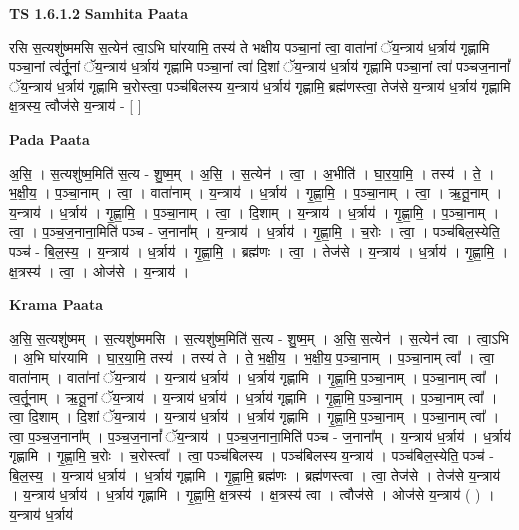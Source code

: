 \documentclass[17pt]{extarticle}
\begin{document}
\textbf{TS 1.6.1.2 } \newline
\textbf{Samhita Paata} \newline

रसि स॒त्यशु॑ष्ममसि स॒त्येन॑ त्वा॒ऽभि घा॑रयामि॒ तस्य॑ ते भक्षीय पञ्चा॒नां त्वा॒ वाता॑नां ॅय॒न्त्राय॑ ध॒र्त्राय॑ गृह्णामि पञ्चा॒नां त्व॑र्तू॒नां ॅय॒न्त्राय॑ ध॒र्त्राय॑ गृह्णामि पञ्चा॒नां त्वा॑ दि॒शां ॅय॒न्त्राय॑ ध॒र्त्राय॑ गृह्णामि पञ्चा॒नां त्वा॑ पञ्चज॒नानां᳚ ॅय॒न्त्राय॑ ध॒र्त्राय॑ गृह्णामि च॒रोस्त्वा॒ पञ्च॑बिलस्य य॒न्त्राय॑ ध॒र्त्राय॑ गृह्णामि॒ ब्रह्म॑णस्त्वा॒ तेज॑से य॒न्त्राय॑ ध॒र्त्राय॑ गृह्णामि क्ष॒त्रस्य॒ त्वौज॑से य॒न्त्राय॑ - [ ] \newline

\textbf{Pada Paata} \newline

अ॒सि॒ । स॒त्यशु॑ष्म॒मिति॑ स॒त्य - शु॒ष्म॒म् । अ॒सि॒ । स॒त्येन॑ । त्वा॒ । अ॒भीति॑ । घा॒र॒या॒मि॒ । तस्य॑ । ते॒ । भ॒क्षी॒य॒ । प॒ञ्चा॒नाम् । त्वा॒ । वाता॑नाम् । य॒न्त्राय॑ । ध॒र्त्राय॑ । गृ॒ह्णा॒मि॒ । प॒ञ्चा॒नाम् । त्वा॒ । ऋ॒तू॒नाम् । य॒न्त्राय॑ । ध॒र्त्राय॑ । गृ॒ह्णा॒मि॒ । प॒ञ्चा॒नाम् । त्वा॒ । दि॒शाम् । य॒न्त्राय॑ । ध॒र्त्राय॑ । गृ॒ह्णा॒मि॒ । प॒ञ्चा॒नाम् । त्वा॒ । प॒ञ्च॒ज॒नाना॒मिति॑ पञ्च - ज॒नाना᳚म् । य॒न्त्राय॑ । ध॒र्त्राय॑ । गृ॒ह्णा॒मि॒ । च॒रोः । त्वा॒ । पञ्च॑बिल॒स्येति॒ पञ्च॑ - बि॒ल॒स्य॒ । य॒न्त्राय॑ । ध॒र्त्राय॑ । गृ॒ह्णा॒मि॒ । ब्रह्म॑णः । त्वा॒ । तेज॑से । य॒न्त्राय॑ । ध॒र्त्राय॑ । गृ॒ह्णा॒मि॒ । क्ष॒त्रस्य॑ । त्वा॒ । ओज॑से । य॒न्त्राय॑ ।  \newline


\textbf{Krama Paata} \newline

अ॒सि॒ स॒त्यशु॑ष्मम् । स॒त्यशु॑ष्ममसि । स॒त्यशु॑ष्म॒मिति॑ स॒त्य - शु॒ष्म॒म् । अ॒सि॒ स॒त्येन॑ । स॒त्येन॑ त्वा । त्वा॒ऽभि । अ॒भि घा॑रयामि । घा॒र॒या॒मि॒ तस्य॑ । तस्य॑ ते । ते॒ भ॒क्षी॒य॒ । भ॒क्षी॒य॒ प॒ञ्चा॒नाम् । प॒ञ्चा॒नाम् त्वा᳚ । त्वा॒ वाता॑नाम् । वाता॑नां ॅय॒न्त्राय॑ । य॒न्त्राय॑ ध॒र्त्राय॑ । ध॒र्त्राय॑ गृह्णामि । गृ॒ह्णा॒मि॒ प॒ञ्चा॒नाम् । प॒ञ्चा॒नाम् त्वा᳚ । त्व॒र्तू॒नाम् । ऋ॒तू॒नां ॅय॒न्त्राय॑ । य॒न्त्राय॑ ध॒र्त्राय॑ । ध॒र्त्राय॑ गृह्णामि । गृ॒ह्णा॒मि॒ प॒ञ्चा॒नाम् । प॒ञ्चा॒नाम् त्वा᳚ । त्वा॒ दि॒शाम् । दि॒शां ॅय॒न्त्राय॑ । य॒न्त्राय॑ ध॒र्त्राय॑ । ध॒र्त्राय॑ गृह्णामि । गृ॒ह्णा॒मि॒ प॒ञ्चा॒नाम् । प॒ञ्चा॒नाम् त्वा᳚ । त्वा॒ प॒ञ्च॒ज॒नाना᳚म् । प॒ञ्च॒ज॒नानां᳚ ॅय॒न्त्राय॑ । प॒ञ्च॒ज॒नाना॒मिति॑ पञ्च - ज॒नाना᳚म् । य॒न्त्राय॑ ध॒र्त्राय॑ । ध॒र्त्राय॑ गृह्णामि । गृ॒ह्णा॒मि॒ च॒रोः । च॒रोस्त्वा᳚ । त्वा॒ पञ्च॑बिलस्य । पञ्च॑बिलस्य य॒न्त्राय॑ । पञ्च॑बिल॒स्येति॒ पञ्च॑ - बि॒ल॒स्य॒ । य॒न्त्राय॑ ध॒र्त्राय॑ । ध॒र्त्राय॑ गृह्णामि । गृ॒ह्णा॒मि॒ ब्रह्म॑णः । ब्रह्म॑णस्त्वा । त्वा॒ तेज॑से । तेज॑से य॒न्त्राय॑ । य॒न्त्राय॑ ध॒र्त्राय॑ । ध॒र्त्राय॑ गृह्णामि । गृ॒ह्णा॒मि॒ क्ष॒त्रस्य॑ । क्ष॒त्रस्य॑ त्वा । त्वौज॑से । ओज॑से य॒न्त्राय॑ ( ) । य॒न्त्राय॑ ध॒र्त्राय॑ \newline
\end{document}

